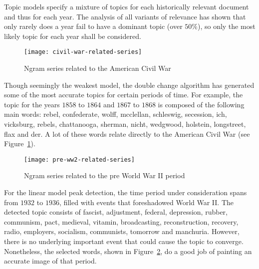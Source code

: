 
Topic models specify a mixture of topics for each historically relevant document and thus for each year. The analysis of all variants of relevance has shown that only rarely does a year fail to have a dominant topic (over $50 \%$), so only the most likely topic for each year shall be considered.

\begin{figure}[t]
\centering
\texttt{[image: civil-war-related-series]}
\caption{Ngram series related to the American Civil War}
\label{fig:civil-war-related-series}
\end{figure}

Though seemingly the weakest model, the double change algorithm has generated some of the most accurate topics for certain periods of time. For example, the topic for the years $1858$ to $1864$ and $1867$ to $1868$ is composed of the following main words: rebel, confederate, wolff, mcclellan, schleswig, secession, ich, vicksburg, rebels, chattanooga, sherman, nicht, wedgwood, holstein, longstreet, flax and der. A lot of these words relate directly to the American Civil War (see Figure~\ref{fig:civil-war-related-series}).

\begin{figure}[t]
\centering
\texttt{[image: pre-ww2-related-series]}
\caption{Ngram series related to the pre World War II period}
\label{fig:pre-ww2-related-series}
\end{figure}

For the linear model peak detection, the time period under consideration spans from $1932$ to $1936$, filled with events that foreshadowed World War II. The detected topic consists of fascist, adjustment, federal, depression, rubber, communism, pact, medieval, vitamin, broadcasting, reconstruction, recovery, radio, employers, socialism, communists, tomorrow and manchuria. However, there is no underlying important event that could cause the topic to converge. Nonetheless, the selected words, shown in Figure~\ref{fig:pre-ww2-related-series}, do a good job of painting an accurate image of that period.

